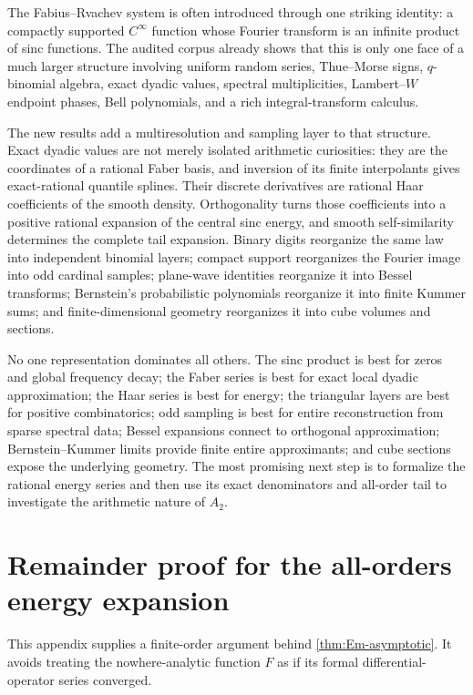 \documentclass[11pt,oneside]{article}
\theoremstyle{definition}
\theoremstyle{remark}
\newcommand{\1}{\mathbf 1}
\begin{document}
The Fabius--Rvachev system is often introduced through one striking identity:
a compactly supported $C^\infty$ function whose Fourier transform is an
infinite product of sinc functions.  The audited corpus already shows that
this is only one face of a much larger structure involving uniform random
series, Thue--Morse signs, $q$-binomial algebra, exact dyadic values, spectral
multiplicities, Lambert--$W$ endpoint phases, Bell polynomials, and a rich
integral-transform calculus.

The new results add a multiresolution and sampling layer to that structure.
Exact dyadic values are not merely isolated arithmetic curiosities: they are
the coordinates of a rational Faber basis, and inversion of its finite
interpolants gives exact-rational quantile splines.  Their discrete derivatives are
rational Haar coefficients of the smooth density.  Orthogonality turns those
coefficients into a positive rational expansion of the central sinc energy,
and smooth self-similarity determines the complete tail expansion.  Binary
digits reorganize the same law into independent binomial layers; compact
support reorganizes the Fourier image into odd cardinal samples; plane-wave
identities reorganize it into Bessel transforms; Bernstein's probabilistic
polynomials reorganize it into finite Kummer sums; and finite-dimensional
geometry reorganizes it into cube volumes and sections.

No one representation dominates all others.  The sinc product is best for
zeros and global frequency decay; the Faber series is best for exact local
dyadic approximation; the Haar series is best for energy; the triangular
layers are best for positive combinatorics; odd sampling is best for entire
reconstruction from sparse spectral data; Bessel expansions connect to
orthogonal approximation; Bernstein--Kummer limits provide finite entire
approximants; and cube sections expose the underlying geometry.  The most
promising next step is to formalize the rational energy series and then use
its exact denominators and all-order tail to investigate the arithmetic nature
of $A_2$.

\appendix

\section{Remainder proof for the all-orders energy expansion}
\label{app:energy-proof}

This appendix supplies a finite-order argument behind
\cref{thm:Em-asymptotic}.  It avoids treating the nowhere-analytic function
$F$ as if its formal differential-operator series converged.
\end{document}
